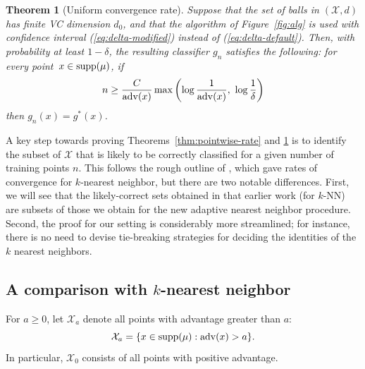 \documentclass{article}
\def\X{{\mathcal X}}
\def\supp{{\rm supp}}
\def\adv{{\rm adv}}
\newtheorem{theorem}{Theorem}
\newcommand{\comment}[3]{{\color{#1} {\bf #2 :} #3}}
\newcommand{\shay}[1]{\comment{purple}{Shay}{#1}}
\begin{document}

\begin{theorem} [Uniform convergence rate]
Suppose that the set of balls in $(\X,d)$ has finite VC dimension $d_0$, and that the algorithm of Figure~\ref{fig:alg} is used with confidence interval (\ref{eq:delta-modified}) instead of (\ref{eq:delta-default}). 
Then, with probability at least $1-\delta$, the resulting classifier $g_n$ satisfies the following: 
for every point~$x\in\supp(\mu)$, if
\[n \geq \frac{C}{\adv(x)} \max \left( \log \frac{1}{\adv(x)}, \ \log \frac{1}{\delta} \right)\]
then $g_n(x)=g^*(x)$.
\label{thm:uniform-rate}
\end{theorem}


A key step towards proving Theorems~\ref{thm:pointwise-rate} and \ref{thm:uniform-rate} is to identify the subset of $\X$ that is likely to be correctly classified for a given number of training points $n$. This follows the rough outline of \cite{ChaudhuriDasgupta2014}, which gave rates of convergence for $k$-nearest neighbor, but there are two notable differences. First, we will see that the likely-correct sets obtained in that earlier work (for $k$-NN) are subsets of those we obtain for the new adaptive nearest neighbor procedure. Second, the proof for our setting is considerably more streamlined; for instance, there is no need to devise tie-breaking strategies for deciding the identities of the $k$ nearest neighbors.

\subsection{A comparison with $k$-nearest neighbor}

For $a \geq 0$, let $\X_a$ denote all points with advantage greater than $a$:
\begin{equation}
\X_a = \{x \in \supp(\mu): \adv(x) > a \} .
\label{eq:advantage-set}
\end{equation}
In particular, $\X_0$ consists of all points with positive advantage. 
\end{document}
